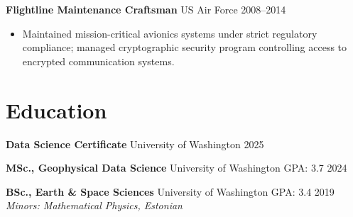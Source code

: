 \documentclass[11pt,a4paper]{article}
\begin{document}
\vspace{0.2cm}
\noindent
\textbf{Flightline Maintenance Craftsman} \hfill US Air Force \hfill 2008--2014
\begin{itemize}
    \item Maintained mission-critical avionics systems under strict regulatory compliance; managed cryptographic security program controlling access to encrypted communication systems.
\end{itemize}

\section*{Education}

\noindent
\textbf{Data Science Certificate} \hfill University of Washington \hfill 2025

\vspace{0.1cm}
\noindent
\textbf{MSc., Geophysical Data Science} \hfill University of Washington \hfill GPA: 3.7 \hfill 2024

\vspace{0.1cm}
\noindent
\textbf{BSc., Earth \& Space Sciences} \hfill University of Washington \hfill GPA: 3.4 \hfill 2019 \\
\textit{Minors: Mathematical Physics, Estonian}
\end{document}

